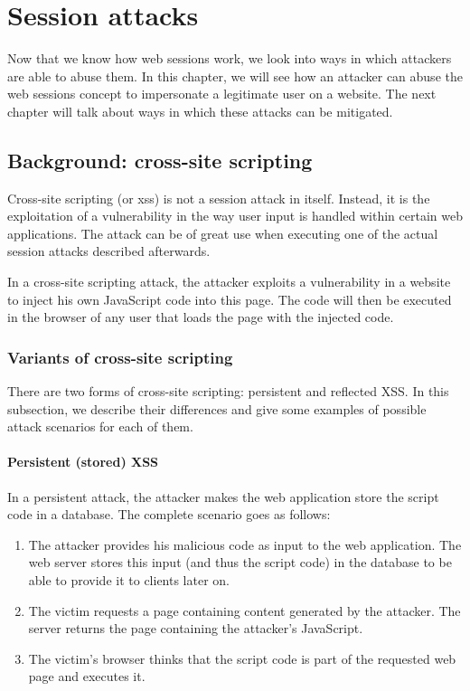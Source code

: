 \chapter{Session attacks}\label{attacks}

Now that we know how web sessions work, we look into ways in which attackers are able to abuse them. In this chapter, we will see how an attacker can abuse the web sessions concept to impersonate a legitimate user on a website. The next chapter will talk about ways in which these attacks can be mitigated.

\section{Background: cross-site scripting}\label{xss}

Cross-site scripting (or \gls{xss}) \cite{DiLucca2005} is not a session attack in itself. Instead, it is the exploitation of a vulnerability in the way user input is handled within certain web applications. The attack can be of great use when executing one of the actual session attacks described afterwards.

In a cross-site scripting attack, the attacker exploits a vulnerability in a website to inject his own JavaScript code into this page. The code will then be executed in the browser of any user that loads the page with the injected code.

\subsection{Variants of cross-site scripting}
There are two forms of cross-site scripting: persistent and reflected XSS. In this subsection, we describe their differences and give some examples of possible attack scenarios for each of them.

\subsubsection{Persistent (stored) XSS}
In a persistent attack, the attacker makes the web application store the script code in a database. The complete scenario goes as follows:

\begin{enumerate}
	\item The attacker provides his malicious code as input to the web application.  The web server stores this input (and thus the script code) in the database to be able to provide it to clients later on.
	\item The victim requests a page containing content generated by the attacker. The server returns the page containing the attacker's JavaScript.
	\item The victim's browser thinks that the script code is part of the requested web page and executes it.
\end{enumerate}

